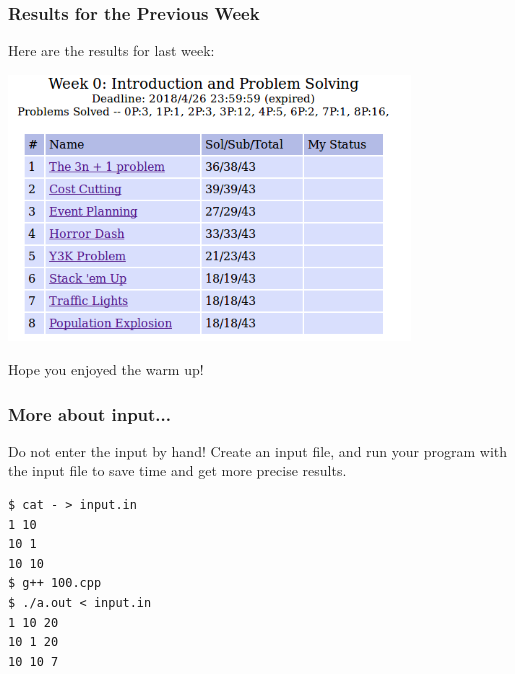 \begin{frame}
  \frametitle{Results for the Previous Week}

  \begin{center}
    Here are the results for last week:

    \bigskip
    
    \includegraphics[width=0.8\textwidth]{img/resultW0}
    
    \bigskip

    Hope you enjoyed the warm up!
  \end{center}

\end{frame}

\begin{frame}[fragile]
  \frametitle{More about input...}

  Do not enter the input by hand! Create an input file, and run your
  program with the input file to save time and get more precise
  results.

  \bigskip

  \begin{block}{}
\begin{verbatim}
$ cat - > input.in
1 10
10 1
10 10 
$ g++ 100.cpp
$ ./a.out < input.in
1 10 20
10 1 20
10 10 7
\end{verbatim}
  \end{block}
  
\end{frame}

